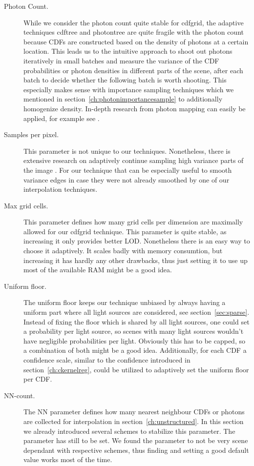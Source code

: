\begin{description}
    \item[Photon Count.] While we consider the photon count quite stable for cdfgrid, the adaptive techniques cdftree and photontree are quite fragile with the photon count because CDFs are constructed based on the density of photons at a certain location. This leads us to the intuitive approach to shoot out photons iteratively in small batches and measure the variance of the CDF probabilities or photon densities in different parts of the scene, after each batch to decide whether the following batch is worth shooting. This especially makes sense with importance sampling techniques which we mentioned in section~\ref{ch:photonimportancesample} to additionally homogenize density. In-depth research from photon mapping can easily be applied, for example see \cite{}.
    \item[Samples per pixel.] This parameter is not unique to our techniques. Nonetheless, there is extensive research on adaptively continue sampling high variance parts of the image \cite{}. For our technique that can be especially useful to smooth variance edges in case they were not already smoothed by one of our interpolation techniques.
    \item[Max grid cells.] This parameter defines how many grid cells per dimension are maximally allowed for our cdfgrid technique. This parameter is quite stable, as increasing it only provides better LOD. Nonetheless there is an easy way to choose it adaptively. It scales badly with memory consumtion, but increasing it has hardly any other drawbacks, thus just setting it to use up most of the available RAM might be a good idea.
    \item[Uniform floor.] The uniform floor keeps our technique unbiased by always having a uniform part where all light sources are considered, see section~\ref{sec:sparse}. Instead of fixing the floor which is shared by all light sources, one could set a probability per light source, so scenes with many light sources wouldn't have negligible probabilities per light. Obviously this has to be capped, so a combination of both might be a good idea. Additionally, for each CDF a confidence scale, similar to the confidence introduced in section~\ref{ch:ckernelreg}, could be utilized to adaptively set the uniform floor per CDF.
    \item[NN-count.] The NN parameter defines how many nearest neighbour CDFs or photons are collected for interpolation in section~\ref{ch:unstructured}. In this section we already introduced several schemes to stabilize this parameter. The parameter has still to be set. We found the parameter to not be very scene dependant with respective schemes, thus finding and setting a good default value works most of the time.

\end{description}
